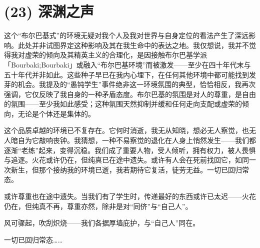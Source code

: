 \section{(23) 深渊之声}

这个“布尔巴基式”的环境无疑对我个人及我对世界与自身定位的看法产生了深远影响。此处并非试图界定这种影响及其在我生命中的表达之地。我仅想说，我并不觉得我对虚荣的倾向及其精英主义的合理化，是因接触布尔巴基学派「Bourbaki;Bourbaki」或融入“布尔巴基环境”而被激发——至少在四十年代末与五十年代并非如此。这些种子早已在我内心埋下，在任何其他环境中都可能找到发芽的机会。我提及的“愚钝学生”事件绝非这一环境氛围的典型，恰恰相反，我再次强调，它仅反映了我自身的一种矛盾态度。布尔巴基的氛围是对人的尊重，是自由的氛围——至少我如此感受；这种氛围天然抑制并缓和任何走向支配或虚荣的倾向，无论是个体还是集体的。

这个品质卓越的环境已不复存在。它何时消逝，我无从知晓，想必无人察觉，也无人暗自为它敲响丧钟。我猜想，一种不易察觉的退化在人身上悄然发生——我们都逐渐“老练”起来，变得沉稳。我们成了重要人物，受人倾听，拥有权力，被人畏惧与追逐。火花或许仍在，但纯真已在途中遗失。或许有人会在死前找回它，如同一次新生，但那个接纳我的环境已逝，我若期待它复活，徒劳无益。一切已回归常态。

或许尊重也在途中遗失。当我们有了学生时，传递最好的东西或许已太迟——火花仍在，但纯真不再，尊重亦然，除非是对“同侪”与“自己人”。

风可骤起，吹刮炽烧——我们各据厚墙庇护，与“自己人”同在。

一切已回归常态……